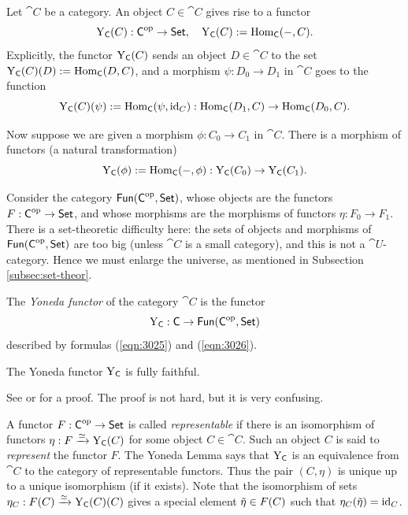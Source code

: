 Let $\cat{C}$ be a category. An object $C \in \cat{C}$ gives rise 
to a functor 
\begin{equation} \label{eqn:3025}
\operatorname{Y}_{\operatorname{\mathsf{C}}}(C) : \operatorname{\mathsf{C}}^{\mathrm{op}} \to \operatorname{\mathsf{Set}} , \quad
\operatorname{Y}_{\operatorname{\mathsf{C}}}(C) := \operatorname{Hom}_{\operatorname{\mathsf{C}}}(-, C) .  
\end{equation}
Explicitly, the functor $\operatorname{Y}_{\operatorname{\mathsf{C}}}(C)$ sends an object 
$D \in \cat{C}$ to the set 
$\operatorname{Y}_{\operatorname{\mathsf{C}}}(C)(D) :=  \operatorname{Hom}_{\operatorname{\mathsf{C}}}(D, C)$,
and a morphism
$\psi : D_0 \to D_1$ in $\cat{C}$ goes to the function 
\[ \operatorname{Y}_{\operatorname{\mathsf{C}}}(C)(\psi) := \operatorname{Hom}_{\operatorname{\mathsf{C}}}(\psi,  \operatorname{id}_C) : 
\operatorname{Hom}_{\operatorname{\mathsf{C}}}(D_1, C) \to \operatorname{Hom}_{\operatorname{\mathsf{C}}}(D_0, C) . \]

Now suppose we are given a morphism 
$\phi : C_0 \to C_1$ in $\cat{C}$. There is a morphism of functors (a natural 
transformation) 
\begin{equation} \label{eqn:3026}
\operatorname{Y}_{\operatorname{\mathsf{C}}}(\phi) := \operatorname{Hom}_{\operatorname{\mathsf{C}}}(-, \phi) : 
\operatorname{Y}_{\operatorname{\mathsf{C}}}(C_0) \to \operatorname{Y}_{\operatorname{\mathsf{C}}}(C_1) .
\end{equation}

Consider the category 
$\operatorname{\mathsf{Fun}}(\operatorname{\mathsf{C}}^{\mathrm{op}}, \operatorname{\mathsf{Set}})$,
whose objects are the functors $F : \operatorname{\mathsf{C}}^{\mathrm{op}} \to \operatorname{\mathsf{Set}}$, and
whose morphisms are the morphisms of functors
$\eta : F_0 \to F_1$.  
There is a set-theoretic difficulty here: the sets of objects and morphisms 
of $\operatorname{\mathsf{Fun}}(\operatorname{\mathsf{C}}^{\mathrm{op}}, \operatorname{\mathsf{Set}})$
are too big (unless $\cat{C}$ is a small category), and this is not a 
$\cat{U}$-category. Hence we must enlarge the universe, as mentioned in 
Subsection \ref{subsec:set-theor}. 

\begin{dfn} \label{dfn:3025}
The {\em Yoneda functor} of the category $\cat{C}$ is the functor
\[ \operatorname{Y}_{\operatorname{\mathsf{C}}} : \operatorname{\mathsf{C}} \to \operatorname{\mathsf{Fun}}(\operatorname{\mathsf{C}}^{\mathrm{op}}, \operatorname{\mathsf{Set}}) \]
described by formulas (\ref{eqn:3025}) and (\ref{eqn:3026}).
\end{dfn}

\begin{thm} \label{thm:3025}
The Yoneda functor $\operatorname{Y}_{\operatorname{\mathsf{C}}}$ is fully faithful. 
\end{thm}

See \cite[Section III.2]{Mac2} or \cite[Section 1.4]{KaSc2} for a proof. The 
proof is not hard, but it is very confusing. 

A functor $F : \operatorname{\mathsf{C}}^{\mathrm{op}} \to \operatorname{\mathsf{Set}}$ is called 
{\em representable} if there is an isomorphism of functors 
$\eta : F \xrightarrow{\simeq} \operatorname{Y}_{\operatorname{\mathsf{C}}}(C)$ for some object $C \in \cat{C}$.
Such an object $C$ is said to {\em represent} the functor $F$. 
The Yoneda Lemma says that $\operatorname{Y}_{\operatorname{\mathsf{C}}}$ is an equivalence
from $\cat{C}$ to the category of representable functors. 
Thus the pair $(C, \eta)$ is unique up to a unique isomorphism (if it exists).
Note that the isomorphism of sets
$\eta_C : F(C) \xrightarrow{\simeq} \operatorname{Y}_{\operatorname{\mathsf{C}}}(C)(C)$ 
gives a special element $\tilde{\eta} \in F(C)$ such that 
$\eta_C(\tilde{\eta}) = \operatorname{id}_C$. 

